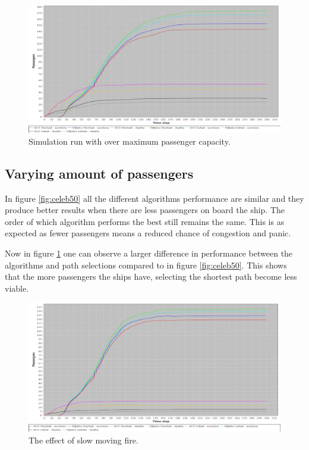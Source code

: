 \begin{figure} [h]
\centering
\hspace*{-1.0in}
\includegraphics[scale=0.35]{images/Graph-using-200-rounds-200-passangers.png}
\caption{Simulation run with over maximum passenger capacity.}
\label{fig:celeb200}
\end{figure}

\subsection{Varying amount of passengers}

In figure \ref{fig:celeb50} all the different algorithms performance are similar and they produce better results when there are less passengers on board the ship. The order of which algorithm performs the best still remains the same. This is as expected as fewer passengers means a reduced chance of congestion and panic. 

Now in figure \ref{fig:celeb200} one can observe a larger difference in performance between the algorithms and path selections compared to in figure \ref{fig:celeb50}. This shows that the more passengers the ships have, selecting the shortest path become less viable.

\begin{figure} [h]
\centering
\hspace*{-1.0in}
\includegraphics[scale=0.35]{images/Graph-using-200-rounds-140-passangers-slow-fire.png}
\caption{The effect of slow moving fire.}
\label{fig:celebSfire}
\end{figure}

